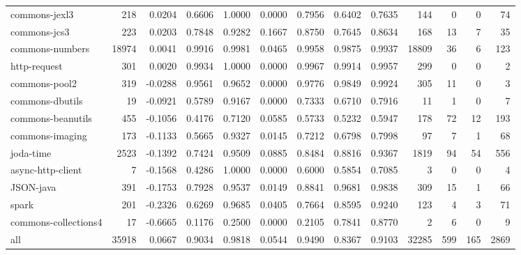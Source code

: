\begin{table*}
\begin{tabular}{lrrrrrrrrrrrr}
          commons-jexl3 &    218 &      0.0204 &  0.6606 &     1.0000 &     0.0000 &  0.7956 &     0.6402 &   0.7635 &    144 &    0 &    0 &    74 \\
           commons-jcs3 &    223 &      0.0203 &  0.7848 &     0.9282 &     0.1667 &  0.8750 &     0.7645 &   0.8634 &    168 &   13 &    7 &    35 \\
        commons-numbers &  18974 &      0.0041 &  0.9916 &     0.9981 &     0.0465 &  0.9958 &     0.9875 &   0.9937 &  18809 &   36 &    6 &   123 \\
           http-request &    301 &      0.0020 &  0.9934 &     1.0000 &     0.0000 &  0.9967 &     0.9914 &   0.9957 &    299 &    0 &    0 &     2 \\
          commons-pool2 &    319 &     -0.0288 &  0.9561 &     0.9652 &     0.0000 &  0.9776 &     0.9849 &   0.9924 &    305 &   11 &    0 &     3 \\
        commons-dbutils &     19 &     -0.0921 &  0.5789 &     0.9167 &     0.0000 &  0.7333 &     0.6710 &   0.7916 &     11 &    1 &    0 &     7 \\
      commons-beanutils &    455 &     -0.1056 &  0.4176 &     0.7120 &     0.0585 &  0.5733 &     0.5232 &   0.5947 &    178 &   72 &   12 &   193 \\
        commons-imaging &    173 &     -0.1133 &  0.5665 &     0.9327 &     0.0145 &  0.7212 &     0.6798 &   0.7998 &     97 &    7 &    1 &    68 \\
              joda-time &   2523 &     -0.1392 &  0.7424 &     0.9509 &     0.0885 &  0.8484 &     0.8816 &   0.9367 &   1819 &   94 &   54 &   556 \\
      async-http-client &      7 &     -0.1568 &  0.4286 &     1.0000 &     0.0000 &  0.6000 &     0.5854 &   0.7085 &      3 &    0 &    0 &     4 \\
              JSON-java &    391 &     -0.1753 &  0.7928 &     0.9537 &     0.0149 &  0.8841 &     0.9681 &   0.9838 &    309 &   15 &    1 &    66 \\
                  spark &    201 &     -0.2326 &  0.6269 &     0.9685 &     0.0405 &  0.7664 &     0.8595 &   0.9240 &    123 &    4 &    3 &    71 \\
   commons-collections4 &     17 &     -0.6665 &  0.1176 &     0.2500 &     0.0000 &  0.2105 &     0.7841 &   0.8770 &      2 &    6 &    0 &     9 \\
                    all &  35918 &      0.0667 &  0.9034 &     0.9818 &     0.0544 &  0.9490 &     0.8367 &   0.9103 &  32285 &  599 &  165 &  2869 \\
\bottomrule
\end{tabular}
\end{table*}

